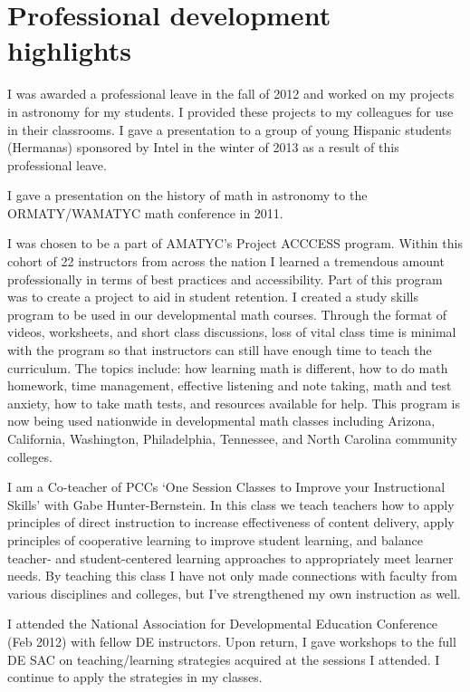 \chapter{Professional development highlights}\label{app:sec:professionaldevelop}

\begin{description}[style=nextline]
	\item[Farshad Barman (Full-time Instructor, Rock Creek Campus)]
	I was awarded a professional leave in the fall of 2012 and worked on my
	projects in astronomy for my students. I provided these projects to my
	colleagues for use in their classrooms. I gave a presentation to a group of
	young Hispanic students (Hermanas) sponsored by Intel in the winter of 2013 as
	a result of this professional leave.

	I gave a presentation on the history of math in astronomy to the ORMATY/WAMATYC
	math conference in 2011.
	\item[Jessica Bernards (Full-time Instructor, Rock Creek Campus)]
	I was chosen to be a part of AMATYC's Project ACCCESS program.  Within
	this cohort of 22 instructors from across the nation I learned a tremendous
	amount professionally in terms of best practices and accessibility.  Part
	of this program was to create a project to aid in student retention.  I
	created a study skills program to be used in our developmental math
	courses.  Through the format of videos, worksheets, and short class
	discussions, loss of vital class time is minimal with the program so that
	instructors can still have enough time to teach the curriculum.  The topics
	include: how learning math is different, how to do math homework, time
	management, effective listening and note taking, math and test anxiety, how
	to take math tests, and resources available for help.  This program is now
	being used nationwide in developmental math classes including Arizona,
	California, Washington, Philadelphia, Tennessee, and North Carolina
	community colleges.

	I am a Co-teacher of PCCs `One Session Classes to Improve your
	Instructional Skills' with Gabe Hunter-Bernstein. In this class we teach
	teachers how to apply principles of direct instruction to increase
	effectiveness of content delivery, apply principles of cooperative learning
	to improve student learning, and balance teacher- and student-centered
	learning approaches to appropriately meet learner needs.  By teaching this
	class I have not only made connections with faculty from various
	disciplines and colleges, but I've strengthened my own instruction as well.
	\item[dMarie Carver (Full-time Instructor, Sylvania Campus)]
	I attended the National Association for Developmental Education Conference
	(Feb 2012) with fellow DE instructors.  Upon return, I gave workshops to
	the full DE SAC on teaching/learning strategies acquired at the sessions I
	attended.  I continue to apply the strategies in my classes.


\end{description}
